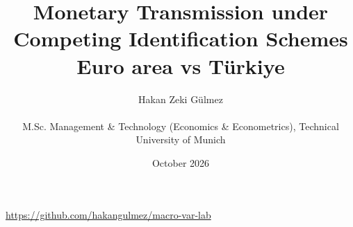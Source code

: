 
\title{Monetary Transmission under Competing Identification Schemes\\\large Euro area vs Türkiye}
\author{Hakan Zeki Gülmez\\[0.4em]\parbox{0.94\textwidth}{\centering\small M.Sc. Management \& Technology (Economics \& Econometrics), Technical University of Munich}}
\date{October 2026}

\maketitle
\begin{center}\small\url{https://github.com/hakangulmez/macro-var-lab}\end{center}


